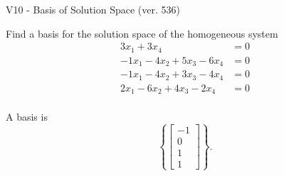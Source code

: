 \begin{exercise}
  \begin{exerciseTitle}V10 - Basis of Solution Space (ver. 536)\end{exerciseTitle}
  \begin{exerciseStatement}
    Find a basis for the solution space of the homogeneous system 
\begin{align*}
 3 x_ 1 + 3 x_ 4 &= 0  \\ 
  -1 x_ 1 -4 x_ 2 + 5 x_ 3 -6 x_ 4 &= 0  \\ 
  -1 x_ 1 -4 x_ 2 + 3 x_ 3 -4 x_ 4 &= 0  \\ 
  2 x_ 1 -6 x_ 2 + 4 x_ 3 -2 x_ 4 &= 0  \\ 
 \end{align*}


 
  \end{exerciseStatement}

  \begin{exerciseAnswer}
   A basis is   
\[\left\{\left[\begin{array}{c}
-1 \\
0 \\
1 \\
1
\end{array}\right]\right\}.\]

  


  \end{exerciseAnswer}
\end{exercise}